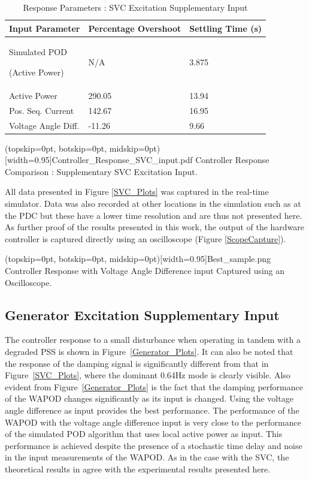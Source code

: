 \documentclass{ieeeaccess}
\begin{document}
\begin{table}[!ht]
\caption{Response Parameters : SVC Excitation Supplementary Input}\label{SVCResponseTable}

\begin{tabular}{|p{80pt}|p{60pt}|p{60pt}|}

\hline \textbf{Input Parameter} & \textbf{Percentage Overshoot} & \textbf{Settling Time (s)} \\
\hline Simulated POD \par (Active Power)& N/A & 3.875 \\ 
\hline Active Power & 290.05 & 13.94 \\ 
\hline Pos. Seq. Current & 142.67 & 16.95\\ 
\hline Voltage Angle Diff. & -11.26 & 9.66\\ 
\hline 

\end{tabular}

\end{table}  

\Figure[tbp!](topskip=0pt, botskip=0pt, midskip=0pt)[width=0.95\columnwidth]{Controller_Response_SVC_input.pdf}
{Controller Response Comparison : Supplementary SVC Excitation Input.\label{SVC_Plots}}

All data presented in Figure \ref{SVC_Plots} was captured in the real-time simulator. Data was also recorded at other locations in the simulation such as at the PDC but these have a lower time resolution and are thus not presented here. As further proof of the results presented in this work, the output of the hardware controller is captured directly using an oscilloscope (Figure \ref{ScopeCapture}).

\Figure[tbp!](topskip=0pt, botskip=0pt, midskip=0pt)[width=0.95\columnwidth]{Best_sample.png}
{Controller Response with Voltage Angle Difference input Captured using an Oscilloscope.\label{ScopeCapture}}

\subsection{Generator Excitation Supplementary Input}
The controller response to a small disturbance when operating in tandem with a degraded PSS is shown in Figure~\ref{Generator_Plots}. It can also be noted that the response of the damping signal is significantly different from that in Figure~\ref{SVC_Plots}, where the dominant 0.64Hz mode is clearly visible. Also evident from Figure~\ref{Generator_Plots} is the fact that the damping performance of the WAPOD changes significantly as its input is changed. Using the voltage angle difference as input provides the best performance. The performance of the WAPOD with the voltage angle difference input is very close to the performance of the simulated POD algorithm that uses local active power as input. This performance is achieved despite the presence of a stochastic time delay and noise in the input measurements of the WAPOD. As in the case with the SVC, the theoretical results in \cite{Yuwa} agree with the experimental results presented here.
\end{document}
